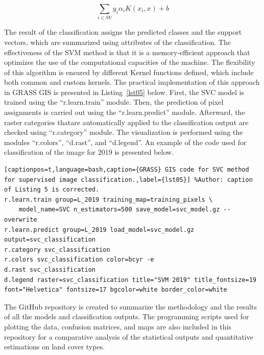 \documentclass[jmse,article,accept,pdftex,oneauthor]{Definitions/mdpi}
\begin{document}
\begin{equation}
\sum_{i\in SV}y_{i}\alpha_{i}K(x_{i},x) + b
\label{eq5}
\end{equation}

The result of the classification assigns the predicted classes and the support vectors, which are summarized using attributes of the classification. The effectiveness of the SVM method is that it is a memory-efficient approach that optimizes the use of the computational capacities of the machine. The flexibility of this algorithm is ensured by different Kernel functions defined, which include both common and custom kernels. The practical implementation of this approach in GRASS GIS is presented in Listing~\ref{lst05} below. First, the SVC model is trained using the ``r.learn.train'' module. Then, the prediction of pixel assignments is carried out using the ``r.learn.predict'' module. Afterward, the raster categories thatare automatically applied to the classification output are checked using ``r.category'' module. The visualization is performed using the modules ``r.colors'', ``d.rast'', and ``d.legend''. An example of the code used for classification of the image for 2019 is presented below. 
\newpage
\begin{lstlisting}[captionpos=t,language=bash,caption={GRASS} GIS code for SVC method for supervised image classification.,label={lst05}] %Author: caption of Listing 5 is corrected.
r.learn.train group=L_2019 training_map=training_pixels \
    model_name=SVC n_estimators=500 save_model=svc_model.gz --overwrite
r.learn.predict group=L_2019 load_model=svc_model.gz output=svc_classification
r.category svc_classification
r.colors svc_classification color=bcyr -e
d.rast svc_classification
d.legend raster=svc_classification title="SVM 2019" title_fontsize=19 font="Helvetica" fontsize=17 bgcolor=white border_color=white
\end{lstlisting}

The GitHub repository is created to summarize the methodology and the results of all the models and classification outputs. The programming scripts used for plotting the data, confusion matrices, and maps are also included in this repository for a comparative analysis of the statistical outputs and quantitative estimations on land cover types.
\end{document}
